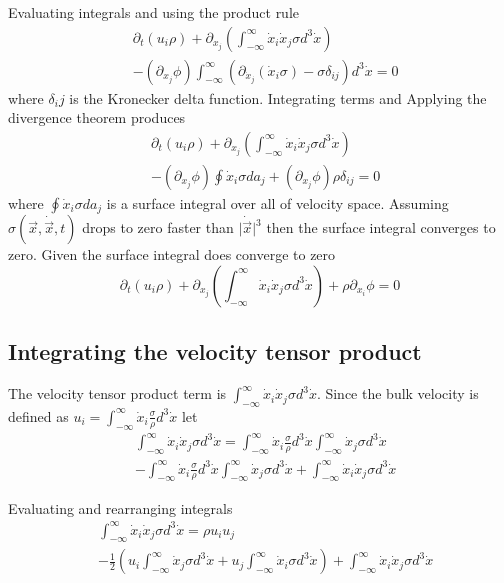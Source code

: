 \documentclass[%
 reprint,
 amsmath,amssymb,
 aps,
]{revtex4-1}
\newcommand{\dvec}[1]{\dot{\vec{#1}}}
\newcommand{\intVdot}[1]{\int_{-\infty}^{\infty} #1 d^3\dot{x}}
\begin{document}
Evaluating integrals and using the product rule
\[
\begin{split}
& \partial_t\left(u_i\rho\right) + \partial_{x_j}\left(\intVdot{\dot{x}_i\dot{x}_j\sigma}\right) \\ & - \left(\partial_{x_j}\phi\right)\intVdot{\left(\partial_{\dot{x}_j}\left(\dot{x}_i\sigma\right) - \sigma\delta_{i j}\right)}=0
\end{split}
\]
where $\delta_ij$ is the Kronecker delta function. Integrating terms and Applying the divergence theorem produces
\[
\begin{split}
& \partial_t\left(u_i\rho\right) + \partial_{x_j}\left(\intVdot{\dot{x}_i\dot{x}_j\sigma}\right) \\ & - \left(\partial_{x_j}\phi\right)\oint\dot{x}_i\sigma da_j + \left(\partial_{x_j}\phi\right)\rho\delta_{i j}=0
\end{split}
\]
where $\oint\dot{x}_i\sigma da_j$ is a surface integral over all of velocity space. Assuming $\sigma(\vec{x}, \dvec{x}, t)$ drops to zero faster than $\lvert\dvec{x}\rvert^3$ then the surface integral converges to zero. Given the surface integral does converge to zero
\begin{equation}
\partial_t\left(u_i\rho\right) + \partial_{x_j}\left(\intVdot{\dot{x}_i\dot{x}_j\sigma}\right) + \rho\partial_{x_i}\phi=0
\label{incomplete_conservation_of_momentum}
\end{equation}

\subsection{Integrating the velocity tensor product}
The velocity tensor product term is $\intVdot{\dot{x}_i\dot{x}_j\sigma}$. Since the bulk velocity is defined as $u_i=\intVdot{\dot{x}_i\frac{\sigma}{\rho}}$ let
\[
\begin{split}
& \intVdot{\dot{x}_i\dot{x}_j\sigma}=\intVdot{\dot{x}_i\frac{\sigma}{\rho}}\intVdot{\dot{x}_j\sigma} \\ & - \intVdot{\dot{x}_i\frac{\sigma}{\rho}}\intVdot{\dot{x}_j\sigma} + \intVdot{\dot{x}_i\dot{x}_j\sigma}
\end{split}
\]

Evaluating and rearranging integrals
\[
\begin{split}
& \intVdot{\dot{x}_i\dot{x}_j\sigma}=\rho u_i u_j \\ & - \frac{1}{2}\left(u_i\intVdot{\dot{x}_j\sigma} + u_j\intVdot{\dot{x}_i\sigma}\right) + \intVdot{\dot{x}_i\dot{x}_j\sigma}
\end{split}
\]
\end{document}
